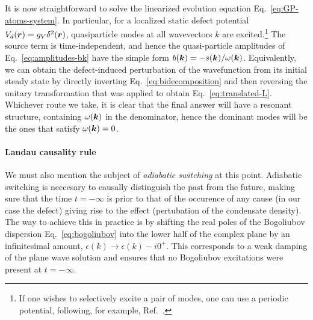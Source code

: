 It is now straightforward to solve the linearized evolution equation
Eq.~\eqref{eq:GP-atoms-system}. In particular, for a localized static
defect potential $V_d(\bm{r}) = g_V \delta^2(\bm{r})$, quasiparticle modes
at all wavevectors $k$ are excited.\footnote{If one wishes to
  selectively excite a pair of modes, one can use a periodic
  potential, following, for example, Ref.~\cite{Ianeselli_2006}.} The
source term is time-independent, and hence the quasi-particle
amplitudes of Eq.~\eqref{eq:amplitudes-bk} have the simple form
$b(\bm{k}) = -s(\bm{k})/\omega(\bm{k})$. Equivalently, we can obtain the
defect-induced perturbation of the wavefunction from its initial
steady state by directly inverting Eq.~\eqref{eq:bidecomposition} and
then reversing the unitary transformation that was applied to obtain
Eq.~\eqref{eq:translated-L}. Whichever route we take, it is clear that
the final answer will have a resonant structure, containing
$\omega(\bm{k})$ in the denominator, hence the dominant modes will be the
ones that satisfy $\omega(\bm{k}) = 0$.

\paragraph{Landau causality rule}
We must also mention the subject of \textit{adiabatic switching} at
this point. Adiabatic switching is neccesary to causally distinguish
the past from the future, making sure that the time $t = -\infty$ is
prior to that of the occurence of any cause (in our case the defect)
giving rise to the effect (pertubation of the condensate density). The
way to achieve this in practice is by shifting the real poles of the
Bogoliubov dispersion Eq.~\eqref{eq:bogoliubov} into the lower half of
the complex plane by an infinitesimal amount,
$\epsilon(k) \rightarrow \epsilon(k) - i0^{+}$. This corresponds to a
weak damping of the plane wave solution and ensures that no Bogoliubov
excitations were present at $t = - \infty$.


